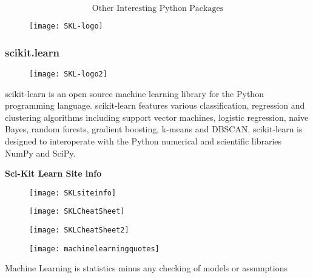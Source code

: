 \documentclass[MASTER.tex]{subfiles}
\begin{document}
 
 
 
 
 \huge
\[ \mbox{Other Interesting Python Packages} \]
 




 
 \begin{figure}
\centering
\texttt{[image: SKL-logo]}

\end{figure}

 

 
 \frametitle{scikit.learn}
  \begin{figure}
   \centering
   \texttt{[image: SKL-logo2]}
  
  \end{figure}
  
  
  scikit-learn is an open source machine learning library for the Python programming language. 
  scikit-learn features various classification, regression and clustering algorithms including support vector machines, logistic regression, naive Bayes, random forests, gradient boosting, k-means and DBSCAN.  scikit-learn is designed to interoperate with the Python numerical and scientific libraries NumPy and SciPy.
  
 
 
\textbf{Sci-Kit Learn Site info}
 \begin{figure}
\centering
\texttt{[image: SKLsiteinfo]}
\end{figure}
 
 
\begin{figure}
\centering
\texttt{[image: SKLCheatSheet]}

\end{figure}
 
 
 \begin{figure}
  \centering
  \texttt{[image: SKLCheatSheet2]}
  
 \end{figure}
 
 
 \begin{figure}
\centering
\texttt{[image: machinelearningquotes]}
\end{figure}
  Machine Learning is statistics minus any checking of models or assumptions
 
\end{document}
